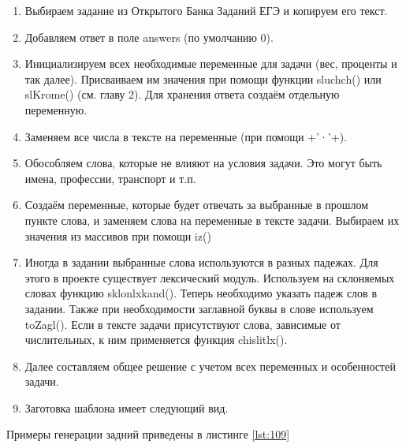\begin{enumerate}
    \item Выбираем задание из Открытого Банка Заданий ЕГЭ и копируем его текст.
    \item Добавляем ответ в поле answers (по умолчанию 0).
    \item Инициализируем всех необходимые переменные для задачи (вес, проценты и так далее). Присваиваем им значения при помощи функции sluchch() или slKrome() (см. главу 2). Для хранения ответа создаём отдельную переменную.
    \item Заменяем все числа в тексте на переменные (при помощи +’·’+). 
    \item Обособляем слова, которые не влияют на условия задачи. Это могут быть имена, профессии, транспорт и т.п. 
    \item Создаём переменные, которые будет отвечать за выбранные в прошлом пункте слова, и заменяем слова на переменные в тексте задачи. Выбираем их значения из массивов при помощи iz()
    \item Иногда в задании выбранные слова используются в разных падежах. Для этого в проекте существует лексический модуль. Используем на склоняемых словах функцию sklonlxkand(). Теперь необходимо указать падеж слов в задании. Также при необходимости заглавной буквы в слове используем toZagl(). Если в тексте задачи присутствуют слова, зависимые от числительных, к ним применяется функция chislitlx().
    \item Далее составляем общее решение с учетом всех переменных и особенностей задачи.
    \item Заготовка шаблона имеет следующий вид.
     
\end{enumerate}

Примеры генерации задний приведены в листинге \ref{lst:109}

